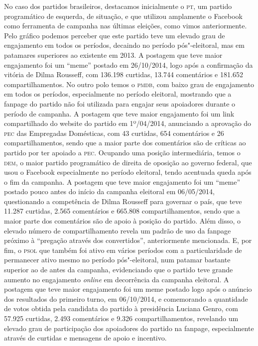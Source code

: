 No caso dos partidos brasileiros, destacamos inicialmente o \textsc{pt}, um
partido programático de esquerda, de situação, e que utilizou amplamente
o Facebook como ferramenta de campanha nas últimas eleições, como vimos
anteriormente. Pelo gráfico podemos perceber que este partido teve um
elevado grau de engajamento em todos os períodos, decaindo no período
pós"-eleitoral, mas em patamares superiores ao existente em 2013. A
postagem que teve maior engajamento foi um ``meme'' postado em
26/10/2014, logo após a confirmação da vitória de Dilma Rousseff, com
136.198 curtidas, 13.744 comentários e 181.652 compartilhamentos. No
outro polo temos o \textsc{pmdb}, com baixo grau de engajamento em todos os
períodos, especialmente no período eleitoral, mostrando que a fanpage do
partido não foi utilizada para engajar seus apoiadores durante o período
de campanha. A postagem que teve maior engajamento foi um link
compartilhado do website do partido em 1º/04/2014, anunciando a
aprovação do \textsc{pec} das Empregadas Domésticas, com 43 curtidas, 654
comentários e 26 compartilhamentos, sendo que a maior parte dos
comentários são de críticas ao partido por ter apoiado a \textsc{pec}. Ocupando
uma posição intermediária, temos o \textsc{dem}, o maior partido programático de
direita de oposição ao governo federal, que usou o Facebook
especialmente no período eleitoral, tendo acentuada queda após o fim da
campanha. A postagem que teve maior engajamento foi um ``meme'' postado
pouco antes do início da campanha eleitoral em 06/05/2014, questionando
a competência de Dilma Rousseff para governar o país, que teve 11.287
curtidas, 2.565 comentários e 665.808 compartilhamentos, sendo que a
maior parte dos comentários são de apoio à posição do partido. Além
disso, o elevado número de compartilhamento revela um padrão de uso da
fanpage próximo à ``pregação através dos convertidos'', anteriormente
mencionada. E, por fim, o \textsc{psol} que também foi ativo em vários períodos
com a particularidade de permanecer ativo mesmo no período
pós"-eleitoral, num patamar bastante superior ao de antes da campanha,
evidenciando que o partido teve grande aumento no engajamento \emph{online} em
decorrência da campanha eleitoral. A postagem que teve maior engajamento
foi um meme postado logo após o anúncio dos resultados do primeiro
turno, em 06/10/2014, e comemorando a quantidade de votos obtida pela
candidata do partido à presidência Luciana Genro, com 57.925 curtidas,
2.493 comentários e 9.326 compartilhamentos, revelando um
elevado grau de participação dos apoiadores do partido na fanpage,
especialmente através de curtidas e mensagens de apoio e incentivo.

